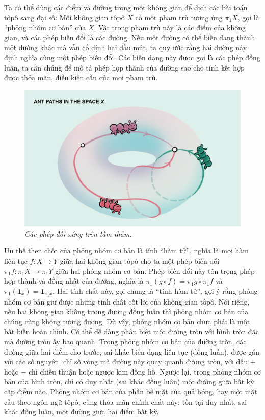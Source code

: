 \begin{multicols}{2}
	\vskip 0.1cm
	Ta có thể dùng các điểm và đường trong một không gian để dịch các bài toán tôpô sang đại số: Mỗi không gian tôpô $X$ có một phạm trù tương ứng $\pi_1 X$, gọi là ``phỏng nhóm cơ bản'' của $X$. Vật trong phạm trù này là các điểm của không gian, và các phép biến đổi là các đường. Nếu một đường có thể biến dạng thành một đường khác mà vẫn cố định hai đầu mút, ta quy ước rằng hai đường này định nghĩa cùng một phép biến đổi. Các biến dạng này được gọi là các phép đồng luân, ta cần chúng để mô tả phép hợp thành của đường sao cho tính kết hợp được thỏa mãn, điều kiện cần của mọi phạm trù.
	\begin{figure}[H]
		\centering
		\vspace*{-5pt}
		\captionsetup{labelformat= empty, justification=centering}
		\includegraphics[width=1\linewidth]{7}
		\caption{\small\textit{\color{duongvaotoanhoc}Các phép đối xứng trên tấm thảm.}}
		\vspace*{-10pt}
	\end{figure}	
	Ưu thế then chốt của phỏng nhóm cơ bản là tính ``hàm tử'', nghĩa là mọi hàm liên tục $f: X \to Y$ giữa hai không gian tôpô cho ta một phép biến đổi $\pi_1 f: \pi_1 X \to \pi_1 Y$ giữa hai phỏng nhóm cơ bản. Phép biến đổi này tôn trọng phép hợp thành và đồng nhất của đường, nghĩa là $\pi_1(g \circ f) = \pi_1 g \circ \pi_1 f$ và $\pi_1(\pmb{1}_x) = \pmb{1}_{\pi_1 x}$. Hai tính chất này, gọi chung là ``tính hàm tử'', gợi ý rằng phỏng nhóm cơ bản giữ được những tính chất cốt lõi của không gian tôpô. Nói riêng, nếu hai không gian không tương đương đồng luân thì phỏng nhóm cơ bản của chúng cũng không tương đương.
	\vskip 0.1cm
	Dù vậy, phỏng nhóm cơ bản chưa phải là một bất biến hoàn chỉnh. Có thể dễ dàng phân biệt một đường tròn với hình tròn đặc mà đường tròn ấy bao quanh. Trong phỏng nhóm cơ bản của đường tròn, các đường giữa hai điểm cho trước, sai khác biến dạng liên tục (đồng luân), được gán với các số nguyên, chỉ số vòng mà đường này quay quanh đường tròn, với dấu $+$ hoặc $-$ chỉ chiều thuận hoặc ngược kim đồng hồ. Ngược lại, trong phỏng nhóm cơ bản của hình tròn, chỉ có duy nhất (sai khác đồng luân) một đường giữa bất kỳ cặp điểm nào. Phỏng nhóm cơ bản của phần bề mặt của quả bóng, hay một mặt cầu theo ngôn ngữ tôpô, cũng thỏa mãn chính chất này: tồn tại duy nhất, sai khác đồng luân, một đường giữa hai điểm bất kỳ.

\end{multicols}
